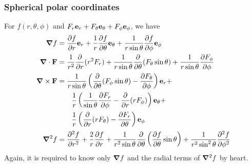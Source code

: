 \documentclass{../template/note}
\begin{document}
    \subsubsection{Spherical polar coordinates}

    For \(f(r, \theta, \phi)\) and \(F_r \V e_r + F_\theta \V e_\theta + F_\phi \V e_\phi\), we have
    \begin{align*}
        \grad f &= \pd{f}{r} \V e_r + \frac 1 r \pd{f}{\theta} \V e_\theta + \frac 1{r \sin \theta} \pd f \phi \V e_\phi \\
        \div \V F &= \frac 1 {r^2} \pd{} r (r^2F_r) + \frac 1 {r \sin \theta} \pd{}{\theta} (F_\theta \sin \theta) + \frac 1 {r \sin \theta} \pd{F_\phi}{\phi} \\
        \curl \V F &= \frac 1 {r \sin \theta}\left(\pd{} \theta (F_\phi \sin \theta)-\pd{F_\theta}{\phi}\right)\V e_r + \\
        &\qquad \frac 1 r \left(\frac 1 {\sin \theta} \pd{F_r}{\phi} - \pd{} r (rF_\phi)\right)\V e_\theta + \\
        &\qquad \frac 1 r \left(\pd{}r(r F_\theta)-\pd{F_r}{\theta}\right)\V e_\phi \\
        \grad^2 f &= \pd{^2f}{r^2} + \frac 2 r \pd f r + \frac 1 {r^2 \sin \theta} \pd{} \theta \left(\pd f \theta \sin \theta\right) + \frac 1 {r^2 \sin^2 \theta} \pd{^2f}{\phi^2}
    \end{align*}
    Again, it is required to know only \(\grad f\) and the radial terms of \(\grad^2 f\) by heart.
    
\end{document}
